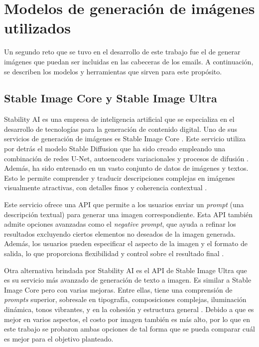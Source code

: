 \section{Modelos de generación de imágenes utilizados}
\label{sec:modelosimagenes}

Un segundo reto que se tuvo en el desarrollo de este trabajo fue el de generar imágenes que puedan ser incluidas en las cabeceras de los emails. A continuación, se describen los modelos y herramientas que sirven para este propósito.

\subsection{Stable Image Core y Stable Image Ultra}


Stability AI es una empresa de inteligencia artificial que se especializa en el desarrollo de tecnologías para la generación de contenido digital. Uno de sus servicios de generación de imágenes es Stable Image Core \cite{stabilityai2023stable}. Este servicio utiliza por detrás el modelo Stable Diffusion que ha sido creado empleando una combinación de redes U-Net, autoencoders variacionales y procesos de difusión \cite{rombach2022high}. Además, ha sido entrenado en un vasto conjunto de datos de imágenes y textos. Esto le permite comprender y traducir descripciones complejas en imágenes visualmente atractivas, con detalles finos y coherencia contextual \cite{stabilityai2023stable}.

Este servicio ofrece una API que permite a los usuarios enviar un \textit{prompt} (una descripción textual) para generar una imagen correspondiente. Esta API también admite opciones avanzadas como el \textit{negative prompt}, que ayuda a refinar los resultados excluyendo ciertos elementos no deseados de la imagen generada. Además, los usuarios pueden especificar el aspecto de la imagen y el formato de salida, lo que proporciona flexibilidad y control sobre el resultado final \cite{stabilityai2023api}.

Otra alternativa brindada por Stability AI es el API de Stable Image Ultra que es su servicio más avanzado de generación de texto a imagen. Es similar a Stable Image Core pero con varias mejoras. Entre ellas, tiene una comprensión de \textit{prompts} superior, sobresale en tipografía, composiciones complejas, iluminación dinámica, tonos vibrantes, y en la cohesión y estructura general \cite{stabilityai2023ultra}. Debido a que es mejor en varios aspectos, el costo por imagen también es más alto, por lo que en este trabajo se probaron ambas opciones de tal forma que se pueda comparar cuál es mejor para el objetivo planteado.

